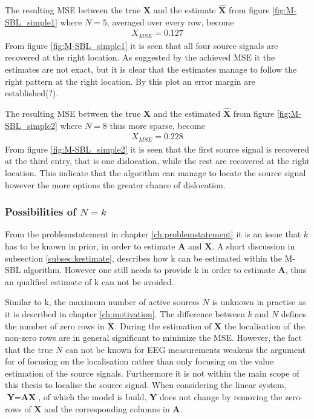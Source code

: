 The resulting MSE between the true $\textbf{X}$ and the estimate $\hat{\textbf{X}}$ from figure \ref{fig:M-SBL_simple1} where $N = 5$, averaged over every row, become 
\begin{align*}
X_{MSE} = 0.127 
\end{align*}
From figure \ref{fig:M-SBL_simple1} it is seen that all four source signals are recovered at the right location. As suggested by the achieved MSE it the estimates are not exact, but it is clear that the estimates manage to follow the right pattern at the right location. By this plot an error margin are established(?).  

The resulting MSE between the true $\textbf{X}$ and the estimated $\hat{\textbf{X}}$ from figure \ref{fig:M-SBL_simple2} where $N = 8$ thus more sparse, become 
\begin{align*}
X_{MSE} = 0.228	 
\end{align*}
From figure \ref{fig:M-SBL_simple2} it is seen that the first source signal is recovered at the third entry, that is one dislocation, while the rest are recovered at the right location. This indicate that the algorithm can manage to locate the source signal however the more options the greater chance of dislocation.     

\subsubsection*{Possibilities of $N=k$}

From the problemstatement in chapter \ref{ch:problemstatement} it is an issue that $k$ has to be known in prior, in order to estimate $\textbf{A}$ and $\textbf{X}$. A short discussion in subsection \ref{subsec:kestimate}, describes how k can be estimated within the M-SBL algorithm. However one still needs to provide k in order to estimate $\textbf{A}$, thus an qualified estimate of k can not be avoided. 

Similar to k, the maximum number of active sources $N$ is unknown in practise as it is described in chapter \ref{ch:motivation}. 
The difference between $k$ and $N$ defines the number of zero rows in $\textbf{X}$.
During the estimation of $\textbf{X}$ the localisation of the non-zero rows are in general significant to minimize the MSE. However, the fact that the true $N$ can not be known for EEG measurements weakens the argument for of focusing on the localisation rather than only focusing on the value estimation of the source signals. Furthermore it is not within the main scope of this thesis to localise the source signal.  
When considering the linear system, $\textbf{Y}=\textbf{AX}$, of which the model is build, $\textbf{Y}$ does not change by removing the zero-rows of $\textbf{X}$ and the corresponding columns in $\textbf{A}$.
 
